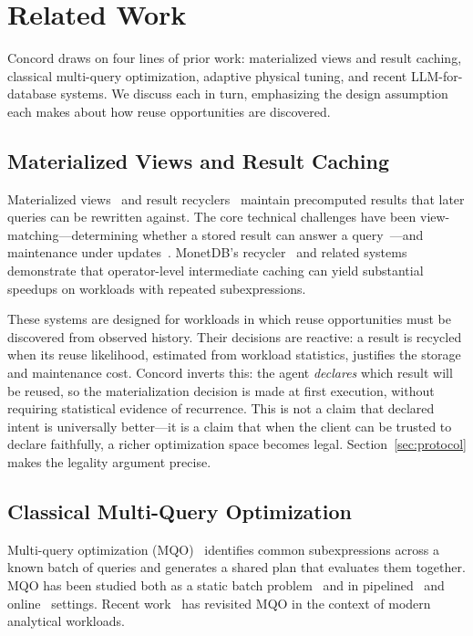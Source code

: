 \section{Related Work}
\label{sec:related}

Concord draws on four lines of prior work: materialized views and result caching, classical multi-query optimization, adaptive physical tuning, and recent LLM-for-database systems. We discuss each in turn, emphasizing the design assumption each makes about how reuse opportunities are discovered.

\subsection{Materialized Views and Result Caching}

Materialized views~\cite{halevy2001mv, goldstein2001mv} and result recyclers~\cite{ivanova2010recycler,nagel2013recycling} maintain precomputed results that later queries can be rewritten against. The core technical challenges have been view-matching---determining whether a stored result can answer a query~\cite{goldstein2001mv}---and maintenance under updates~\cite{gupta1995mvmaint}. MonetDB's recycler~\cite{ivanova2010recycler} and related systems~\cite{phan2008predictableperf} demonstrate that operator-level intermediate caching can yield substantial speedups on workloads with repeated subexpressions.

These systems are designed for workloads in which reuse opportunities must be discovered from observed history. Their decisions are reactive: a result is recycled when its reuse likelihood, estimated from workload statistics, justifies the storage and maintenance cost. Concord inverts this: the agent \emph{declares} which result will be reused, so the materialization decision is made at first execution, without requiring statistical evidence of recurrence. This is not a claim that declared intent is universally better---it is a claim that when the client can be trusted to declare faithfully, a richer optimization space becomes legal. Section~\ref{sec:protocol} makes the legality argument precise.

\subsection{Classical Multi-Query Optimization}

Multi-query optimization (MQO)~\cite{sellis1988mqo,roy2000mqo,dalvi2001pipelined} identifies common subexpressions across a known batch of queries and generates a shared plan that evaluates them together. MQO has been studied both as a static batch problem~\cite{roy2000mqo} and in pipelined~\cite{dalvi2001pipelined} and online~\cite{silva2012onlinemqo} settings. Recent work~\cite{mqo2020revisit} has revisited MQO in the context of modern analytical workloads.


